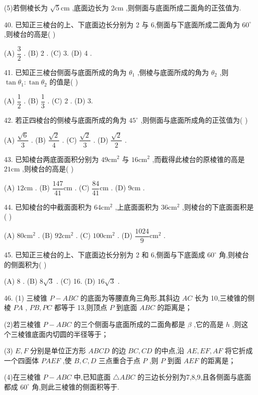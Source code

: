 (5)若侧棱长为 $\sqrt{5}\mathrm{{cm}}$ ,底面边长为 $2\mathrm{{cm}}$ ,则侧面与底面所成二面角的正弦值为\blkda{}.

40. 已知正三棱台的上、下底面边长分别为 2 与 6,侧面与下底面所成二面角为 ${60}^{ \circ  }$ ,则棱台的高是(   )

(A) $\dfrac{3}{2}$ . (B) 2 . (C) 3. (D) 4 .

41. 已知正三棱台侧面与底面所成的角为 ${\theta }_{1}$ ,侧棱与底面所成的角为 ${\theta }_{2}$ ,则 $\tan {\theta }_{1} : \tan {\theta }_{2}$ 的值是(   )

(A) $\dfrac{1}{2}$ . (B) $\dfrac{1}{3}$ . (C) 2 . (D) 3.

42. 若正四棱台的侧棱与底面所成的角为 ${45}^{ \circ  }$ ,则侧面与底面所成角的正弦值为(   )

(A) $\dfrac{\sqrt{6}}{3}$ . (B) $\dfrac{\sqrt{2}}{4}$ . (C) $\dfrac{\sqrt{2}}{3}$ . (D) $\dfrac{\sqrt{2}}{2}$ .

43. 已知棱台两底面面积分别为 ${49}{\mathrm{{cm}}}^{2}$ 与 ${16}{\mathrm{{cm}}}^{2}$ ,而截得此棱台的原棱锥的高是 ${21}\mathrm{{cm}}$ ,则棱台的高是(   )

(A) ${12}\mathrm{{cm}}$ . (B) $\dfrac{147}{41}\mathrm{{cm}}$ . (C) $\dfrac{84}{41}\mathrm{{cm}}$ . (D) $9\mathrm{{cm}}$ .

44. 已知棱台的中截面面积为 ${64}{\mathrm{{cm}}}^{2}$ ,上底面面积为 ${36}{\mathrm{{cm}}}^{2}$ ,则棱台的下底面面积是(   )

(A) ${80}{\mathrm{{cm}}}^{2}$ . (B) ${92}{\mathrm{{cm}}}^{2}$ . (C) ${100}{\mathrm{{cm}}}^{2}$ . (D) $\dfrac{1024}{9}{\mathrm{{cm}}}^{2}$ .

45. 已知正三棱台的上、下底面边长分别为 2 和 6,侧面与下底面成 ${60}^{ \circ  }$ 角,则棱台的侧面积为(   )

(A) 8 . (B) $8\sqrt{3}$ . (C) 16. (D) ${16}\sqrt{3}$ .

46. (1) 三棱锥 $P - {ABC}$ 的底面为等腰直角三角形,其斜边 ${AC}$ 长为 10,三棱锥的侧棱 ${PA}$ , ${PB},{PC}$ 都等于 13,则顶点 $P$ 到底面 ${ABC}$ 的距离是\blkda{}；

(2)若三棱锥 $P - {ABC}$ 的三个侧面与底面所成的二面角都是 $\beta$ ,它的高是 $h$ ,则这个三棱锥底面内切圆的半径等于\blkda{}；

(3) $E,F$ 分别是单位正方形 ${ABCD}$ 的边 ${BC},{CD}$ 的中点,沿 ${AE},{EF},{AF}$ 将它折成一个四面体 ${PAEF}$ ,使 $B,C,D$ 三点重合于点 $P$ ,则 $P$ 到面 ${AEF}$ 的距离是\blkda{}；

(4)在三棱锥 $P - {ABC}$ 中,已知底面 $\bigtriangleup  {ABC}$ 的三边长分别为7,8,9,且各侧面与底面都成 ${60}^{ \circ  }$ 角,则此三棱锥的侧面积等于\blkda{}.

